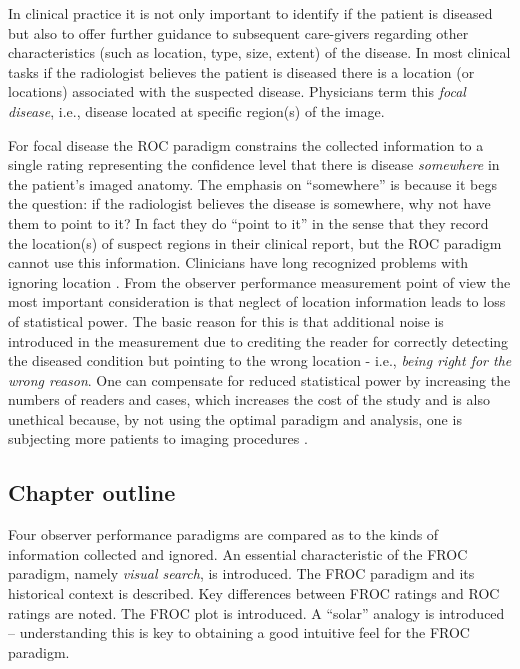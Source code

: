 \documentclass[
]{book}
\begin{document}
In clinical practice it is not only important to identify if the patient is diseased but also to offer further guidance to subsequent care-givers regarding other characteristics (such as location, type, size, extent) of the disease. In most clinical tasks if the radiologist believes the patient is diseased there is a location (or locations) associated with the suspected disease. Physicians term this \emph{focal disease}, i.e., disease located at specific region(s) of the image.

For focal disease the ROC paradigm constrains the collected information to a single rating representing the confidence level that there is disease \emph{somewhere} in the patient's imaged anatomy. The emphasis on ``somewhere'' is because it begs the question: if the radiologist believes the disease is somewhere, why not have them to point to it? In fact they do ``point to it'' in the sense that they record the location(s) of suspect regions in their clinical report, but the ROC paradigm cannot use this information. Clinicians have long recognized problems with ignoring location \citep{BlackDwyer1990, RN1921}. From the observer performance measurement point of view the most important consideration is that neglect of location information leads to loss of statistical power. The basic reason for this is that additional noise is introduced in the measurement due to crediting the reader for correctly detecting the diseased condition but pointing to the wrong location - i.e., \emph{being right for the wrong reason}. One can compensate for reduced statistical power by increasing the numbers of readers and cases, which increases the cost of the study and is also unethical because, by not using the optimal paradigm and analysis, one is subjecting more patients to imaging procedures \citep{RN2662}.

\hypertarget{chapter-outline}{%
\subsection{Chapter outline}\label{chapter-outline}}

Four observer performance paradigms are compared as to the kinds of information collected and ignored. An essential characteristic of the FROC paradigm, namely \emph{visual search}, is introduced. The FROC paradigm and its historical context is described. Key differences between FROC ratings and ROC ratings are noted. The FROC plot is introduced. A ``solar'' analogy is introduced -- understanding this is key to obtaining a good intuitive feel for the FROC paradigm.
\end{document}
